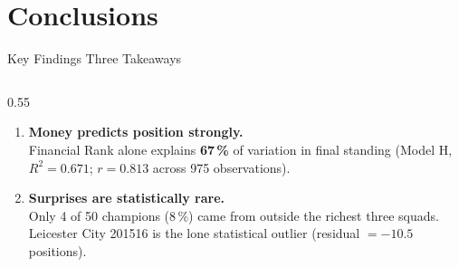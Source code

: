 \documentclass[aspectratio=169,10pt]{beamer}
\begin{document}
\section{Conclusions}

\begin{frame}{Key Findings \textendash{} Three Takeaways}
  \begin{columns}[T]
    \begin{column}{0.55\textwidth}
      \vspace{4pt}
      \begin{enumerate}
        \setlength\itemsep{10pt}
        \item \textbf{Money predicts position strongly.}\\
              {\small Financial Rank alone explains
              \textbf{67\,\%} of variation in final
              standing (Model H, $R^2 = 0.671$;
              $r = 0.813$ across 975 observations).}

        \item \textbf{Surprises are statistically rare.}\\
              {\small Only 4 of 50 champions (8\,\%)
              came from outside the richest three
              squads. Leicester City 2015\textendash{}16
              is the lone statistical outlier
              (residual $= -10.5$ positions).}


\end{enumerate}
\end{column}
\end{columns}
\end{frame}
\end{document}
